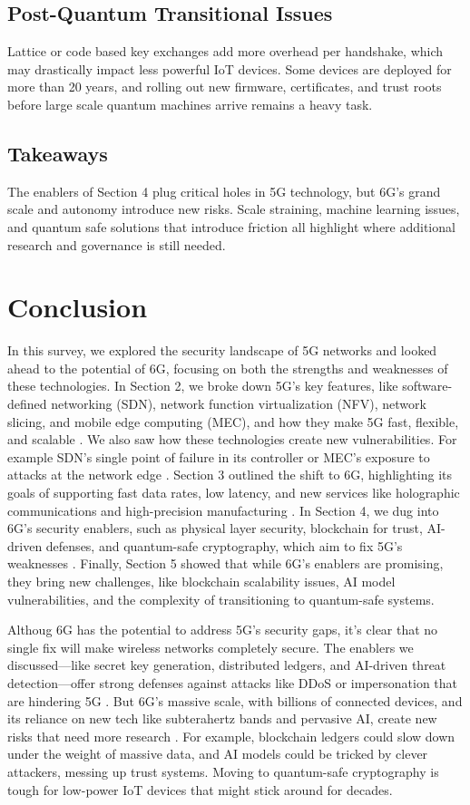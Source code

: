 \documentclass[acmtog]{acmart}
\begin{document}
\subsection{Post-Quantum Transitional Issues}
Lattice or code based key exchanges add more overhead per handshake, which may drastically impact less powerful IoT devices. Some devices are deployed for more than 20 years, and rolling out new firmware, certificates, and trust roots before large scale quantum machines arrive remains a heavy task.

\subsection{Takeaways}
The enablers of Section 4 plug critical holes in 5G technology, but 6G's grand scale and autonomy introduce new risks. Scale straining, machine learning issues, and quantum safe solutions that introduce friction all highlight where additional research and governance is still needed.

\section{Conclusion}

In this survey, we explored the security landscape of 5G networks and looked ahead to the potential of 6G, focusing on both the strengths and weaknesses of these technologies. In Section 2, we broke down 5G’s key features, like software-defined networking (SDN), network function virtualization (NFV), network slicing, and mobile edge computing (MEC), and how they make 5G fast, flexible, and scalable \cite{ref6}. We also saw how these technologies create new vulnerabilities. For example SDN’s single point of failure in its controller or MEC’s exposure to attacks at the network edge \cite{ref3}. Section 3 outlined the shift to 6G, highlighting its goals of supporting fast data rates, low latency, and new services like holographic communications and high-precision manufacturing \cite{ref4}. In Section 4, we dug into 6G’s security enablers, such as physical layer security, blockchain for trust, AI-driven defenses, and quantum-safe cryptography, which aim to fix 5G’s weaknesses \cite{ref1,ref2,ref5,ref8}. Finally, Section 5 showed that while 6G’s enablers are promising, they bring new challenges, like blockchain scalability issues, AI model vulnerabilities, and the complexity of transitioning to quantum-safe systems.

Althoug 6G has the potential to address 5G’s security gaps, it’s clear that no single fix will make wireless networks completely secure. The enablers we discussed—like secret key generation, distributed ledgers, and AI-driven threat detection—offer strong defenses against attacks like DDoS or impersonation that are hindering 5G \cite{ref1,ref2,ref5}. But 6G’s massive scale, with billions of connected devices, and its reliance on new tech like subterahertz bands and pervasive AI, create new risks that need more research \cite{ref4}. For example, blockchain ledgers could slow down under the weight of massive data, and AI models could be tricked by clever attackers, messing up trust systems. Moving to quantum-safe cryptography is tough for low-power IoT devices that might stick around for decades.
\end{document}
